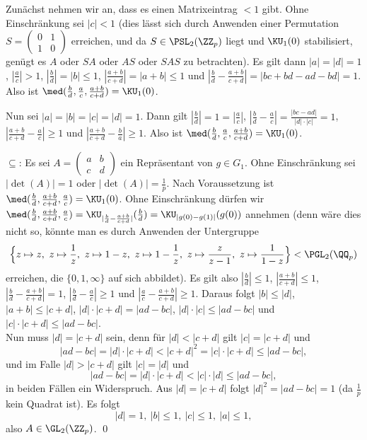 Zunächst nehmen wir an, dass es einen Matrixeintrag $<1$ gibt.
Ohne Einschränkung sei $|c|<1$ (dies lässt sich durch Anwenden einer
Permutation $S=\begin{pmatrix}
0 & 1 \\
1 & 0
\end{pmatrix}$
erreichen, und da $S\in\PSL_2(\ZZ_p)$ liegt und $\KU_1(0)$ 
stabilisiert, genügt es $A$ oder $SA$ oder $AS$ oder $SAS$ zu
betrachten).
Es gilt dann $|a|=|d|=1$, $|\frac{a}{c}|>1$,
$|\frac{b}{d}|=|b|\leq 1$, $|\frac{a+b}{c+d}|=|a+b|\leq 1$ und
$|\frac{b}{d}-\frac{a+b}{c+d}|=|bc+bd-ad-bd|=1$.
Also ist $\med(\frac{b}{d},\frac{a}{c},\frac{a+b}{c+d})=\KU_1(0)$.

Nun sei $|a|=|b|=|c|=|d|=1$.
Dann gilt $|\frac{b}{d}|=1=|\frac{a}{c}|$,
$|\frac{b}{d}-\frac{a}{c}|=\frac{|bc-ad|}{|d|\cdot|c|}=1$,
$|\frac{a+b}{c+d}-\frac{a}{c}|\geq 1$ und
$|\frac{a+b}{c+d}-\frac{b}{a}|\geq 1$. Also ist
$\med(\frac{b}{d},\frac{a}{c},\frac{a+b}{c+d})=\KU_1(0)$.

\glqq$\subseteq$\grqq:
Es sei $A=\begin{pmatrix}
a & b \\
c & d
\end{pmatrix}$ ein Repräsentant von $g\in G_1$.
Ohne Einschränkung sei $|\det(A)|=1$ oder $|\det(A)|=\frac{1}{p}$.
Nach Voraussetzung ist
$\med(\frac{b}{d},\frac{a+b}{c+d},\frac{a}{c})=\KU_1(0)$.
Ohne Einschränkung dürfen wir
$\med(\frac{b}{d},\frac{a+b}{c+d},\frac{a}{c})
=\KU_{|\frac{b}{d}-\frac{a+b}{c+d}|}(\frac{b}{d})
=\KU_{|g(0)-g(1)|}(g(0))$ annehmen
(denn wäre dies nicht so, könnte man es durch Anwenden der Untergruppe
\[
\Bigl\{z\mapsto z,\ z\mapsto\frac{1}{z},\
 z\mapsto 1-z,\ z\mapsto 1-\frac{1}{z},\
 z\mapsto \frac{z}{z-1},\ z\mapsto\frac{1}{1-z}
 \Bigr\}
 < \PGL_2(\QQ_p)
\]
erreichen, die $\{0,1,\infty\}$ auf sich abbildet).
Es gilt also $|\frac{b}{d}|\leq 1$, $|\frac{a+b}{c+d}|\leq 1$,
$|\frac{b}{d}-\frac{a+b}{c+d}|=1$, $|\frac{b}{d}-\frac{a}{c}|\geq 1$
und $|\frac{a}{c}-\frac{a+b}{c+d}|\geq 1$.
Daraus folgt
$|b|\leq |d|$, $|a+b|\leq|c+d|$, $|d|\cdot|c+d|=|ad-bc|$,
$|d|\cdot|c|\leq|ad-bc|$ und $|c|\cdot|c+d|\leq|ad-bc|$.\\
Nun muss $|d|=|c+d|$ sein, denn für $|d|<|c+d|$ gilt $|c|=|c+d|$
und
\[
|ad-bc|=|d|\cdot|c+d|<|c+d|^2=|c|\cdot|c+d|\leq|ad-bc|,
\]
und im Falle $|d|>|c+d|$ gilt $|c|=|d|$ und
\[
|ad-bc|=|d|\cdot|c+d|<|c|\cdot|d|\leq|ad-bc|,
\]
in beiden Fällen ein Widerspruch.
Aus $|d|=|c+d|$ folgt $|d|^2=|ad-bc|=1$ (da $\frac{1}{p}$ kein Quadrat 
ist). Es folgt
\[
|d|=1,\ |b|\leq 1,\ |c|\leq 1,\ |a|\leq 1,
\]
also $A\in\GL_2(\ZZ_p)$.
\qed

